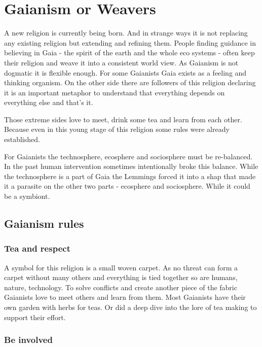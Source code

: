 

\section {Gaianism or Weavers}

A new religion is currently being born. And in strange ways it is not replacing any existing religion but extending and refining them. People finding guidance in believing in Gaia - the spirit of the earth and the whole eco systems - often keep their religion and weave it into a consistent world view. As Gaianism is not dogmatic it is flexible enough.
For some Gaianists Gaia exists as a feeling and thinking organism. On the other side there are followers of this religion declaring it is an important metaphor to understand that everything depends on everything else and that's it.

Those extreme sides love to meet, drink some tea and learn from each other. Because even in this young stage of this religion some rules were already established.

For Gaianists the technosphere, ecosphere and sociosphere must be re-balanced. In the past human intervention sometimes intentionally broke this balance. While the technosphere is a part of Gaia the Lemmings forced it into a shap that made it a parasite on the other two parts - ecosphere and sociosphere. While it could be a symbiont.

\subsection{Gaianism rules}

\subsubsection{Tea and respect}

A symbol for this religion is a small woven carpet. As no threat can form a carpet without many others and everything is tied together so are humans, nature, technology. To solve conflicts and create another piece of the fabric Gaianists love to meet others and learn from them. Most Gaianists have their own garden with herbs for teas. Or did a deep dive into the lore of tea making to support their effort.

\subsubsection{Be involved}


